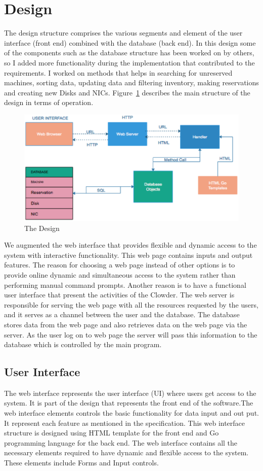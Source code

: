 \section{Design} \label{Designstructure}
The design structure comprises the various  segments and element of the user interface (front end) combined with the database (back end). In this design some of the components such as the database structure has been worked on by others, so I added more functionality during the implementation that contributed to the requirements. I worked on  methods that helps in searching for unreserved machines, sorting data, updating data and filtering inventory, making reservations and creating new Disks and NICs.  Figure~\ref{fig:Design} describes the main structure of the design in terms of operation.
\begin{figure}[h]
  \includegraphics[width=\linewidth]{Design.eps}
  \caption{The Design}
  \label{fig:Design}
\end{figure}
\pagebreak
We augmented the web interface that provides  flexible and dynamic access to the system with interactive functionality. This web page contains inputs and output features. The reason for choosing a web page instead of other options is to provide online dynamic and simultaneous  access to the system rather than performing manual command prompts. Another reason is to have a functional user interface that present the activities of the Clowder. The web server is responsible for serving the web page with all the resources requested by the users, and it serves as a channel between the user and the database. The database stores data from the web page and also retrieves data on the web page via the server. As the user log on to web page the server will pass this information to the database which is controlled by the main program. 

\subsection{User Interface}
The web interface represents the user interface (UI) where users get access to the system. It is part of the design that represents the front end of the software.The web interface elements controls the basic functionality for data input and out put. It represent each feature as mentioned in the specification. This web interface structure is designed using  HTML template for the front end and Go programming language for the back end. 
The web interface contains all the necessary elements required to have dynamic and flexible access to the system. These elements include Forms and Input controls.
